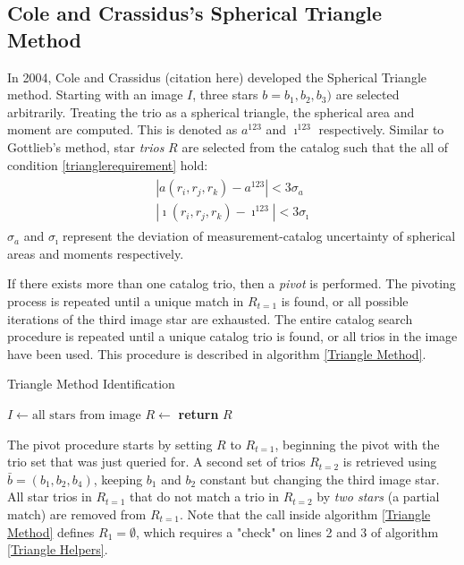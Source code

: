 \subsection{Cole and Crassidus's Spherical Triangle Method}
In 2004, Cole and Crassidus (citation here) developed the Spherical Triangle method. Starting with an image $I$, three stars $b = b_1, b_2, b_3)$ are selected arbitrarily. Treating the trio as a spherical triangle, the spherical area and moment are computed. This is denoted as $a^{123}$ and $\imath^{123}$ respectively. Similar to Gottlieb's method, star \textit{trios} $R$ are selected from the catalog such that the all of condition \eqref{trianglerequirement} hold:
\begin{align}
\begin{split}
\label{trianglerequirement}
| a(r_i, r_j, r_k) - a^{123} | < 3 \sigma_a
\\
| \imath(r_i, r_j, r_k) - \imath^{123} | < 3\sigma_{\imath}
\end{split}
\end{align}
$\sigma_a$ and $\sigma_{\imath}$ represent the deviation of measurement-catalog uncertainty of spherical areas and moments respectively.

If there exists more than one catalog trio, then a \textit{pivot} is performed. The pivoting process is repeated until a unique match in $R_{t=1}$ is found, or all possible iterations of the third image star are exhausted. The entire catalog search procedure is repeated until a unique catalog trio is found, or all trios in the image have been used. This procedure is described in algorithm \eqref{Triangle Method}.

\begin{algorithm}
\caption{Triangle Method Identification}
\label{Triangle Method}
\begin{algorithmic}[1]
\State $I \gets \text{all stars} \text{ from image}$
\State $R \gets$ 
\State \textbf{return} $R$
\EndIf
\EndFor
\EndFor
\EndFor
\EndProcedure
\end{algorithmic}
\end{algorithm}

The pivot procedure starts by setting $R$ to $R_{t=1}$, beginning the pivot with the trio set that was just queried for. A second set of trios $R_{t=2}$ is retrieved using $\bar{b} = (b_1, b_2, b_4)$, keeping $b_1$ and $b_2$ constant but changing the third image star. All star trios in $R_{t=1}$ that do not match a trio in $R_{t=2}$ by \textit{two stars} (a partial match) are removed from $R_{t=1}$. Note that the  call inside algorithm \eqref{Triangle Method} defines $R_1 = \emptyset$, which requires a "check" on lines 2 and 3 of algorithm \eqref{Triangle Helpers}.

